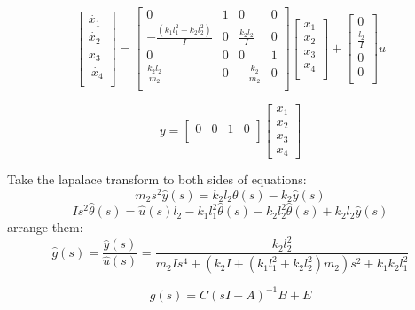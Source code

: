 \documentclass{article}
\begin{document}
\begin{equation*}       %
    \left[                %
    \begin{array}{c}   %
    \dot{x_1} \\  %
    \dot{x_2} \\  %
    \dot{x_3} \\\
    \dot{x_4} \\
    \end{array}
    \right]=      %
    \left[                %
    \begin{array}{cccc}   %
    0 & 1 & 0 & 0\\
    -\frac{(k_1l_1^2+k_2l_2^2)}{I} & 0 & \frac{k_2l_2}{I} & 0\\
    0 & 0 & 0 & 1\\
    \frac{k_2l_2}{m_2} & 0 & -\frac{k_2}{m_2} & 0\\    
    \end{array}
    \right]
    \left[                %
    \begin{array}{c}   %
    x_1 \\  %
    x_2 \\  %
    x_3 \\
    x_4 \\
    \end{array}
    \right]+
    \left[                %
    \begin{array}{c}   %
    0\\
    \frac{l_2}{I}\\
    0\\
    0\\
    \end{array}
    \right]u               
\end{equation*}

\begin{equation*}
    y=\left[
    \begin{array}{cccc}
    0 & 0 & 1 & 0\\
    \end{array}
    \right]
    \left[
    \begin{array}{c}
    x_1 \\  %
    x_2 \\  %
    x_3 \\
    x_4
    \end{array}
    \right]
    \end{equation*}


Take the lapalace transform to both sides of equations:
\[m_2s^2\hat{y}(s)=k_2l_2\theta(s)-k_2\hat{y}(s)\]
\[Is^2\hat{\theta}(s)=\hat{u}(s)l_2-k_1l_1^2\hat{\theta}(s)-k_2l_2^2\hat{\theta}(s)+k_2l_2\hat{y}(s)\]
arrange them:
\[\hat{g}(s)=\frac{\hat{y}(s)}{\hat{u}(s)}=\frac{k_2l_2^2}{m_2Is^4+(k_2I+(k_1l_1^2+k_2l_2^2)m_2)s^2+k_1k_2l_1^2}\]

\[g(s)=C(sI-A)^{-1}B+E\]
\end{document}
